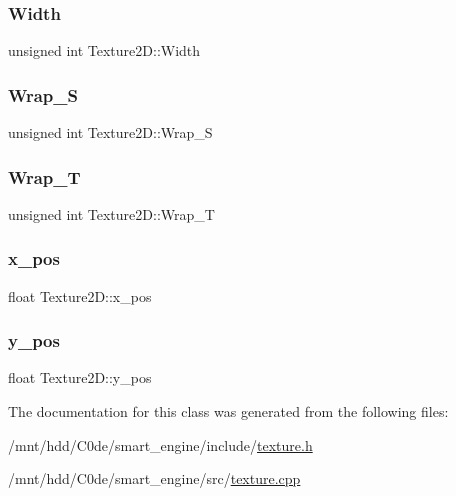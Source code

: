 \mbox{\label{classTexture2D_a558054990d7e668b9df119713922fa53}} 
\subsubsection{\texorpdfstring{Width}{Width}}
{\footnotesize\ttfamily unsigned int Texture2\+D\+::\+Width}

\mbox{\label{classTexture2D_a95dc93c0a76a5d30d7b1fade841a58df}} 
\subsubsection{\texorpdfstring{Wrap\+\_\+S}{Wrap\_S}}
{\footnotesize\ttfamily unsigned int Texture2\+D\+::\+Wrap\+\_\+S}

\mbox{\label{classTexture2D_a80e39ea4cf66bbed444cdf135afffb92}} 
\subsubsection{\texorpdfstring{Wrap\+\_\+T}{Wrap\_T}}
{\footnotesize\ttfamily unsigned int Texture2\+D\+::\+Wrap\+\_\+T}

\mbox{\label{classTexture2D_a5d7a290a99c99a921e0bbed6e8b529f8}} 
\subsubsection{\texorpdfstring{x\+\_\+pos}{x\_pos}}
{\footnotesize\ttfamily float Texture2\+D\+::x\+\_\+pos}

\mbox{\label{classTexture2D_aeb7e15444821c2bb23d5026ca4430e58}} 
\subsubsection{\texorpdfstring{y\+\_\+pos}{y\_pos}}
{\footnotesize\ttfamily float Texture2\+D\+::y\+\_\+pos}



The documentation for this class was generated from the following files\+:\begin{DoxyCompactItemize}
\item 
/mnt/hdd/\+C0de/smart\+\_\+engine/include/\hyperlink{texture_8h}{texture.\+h}\item 
/mnt/hdd/\+C0de/smart\+\_\+engine/src/\hyperlink{texture_8cpp}{texture.\+cpp}\end{DoxyCompactItemize}
